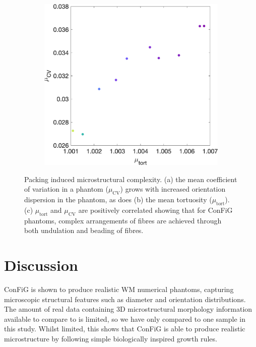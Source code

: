 \begin{figure}
\begin{subfigure}[]{0.32\textwidth}
    \caption{}
  \end{subfigure}
  ~
  \begin{subfigure}[]{0.32\textwidth}
    \includegraphics[width=\textwidth]{figures/micro/meantort_vd_meanCV}
    \caption{}
  \end{subfigure}
  \caption[Packing induced microstructural complexity]{Packing induced microstructural complexity. (a) the mean coefficient of variation in a phantom ($\mu_{\mathrm{CV}}$) grows with increased orientation dispersion in the phantom, as does (b) the mean tortuosity ($\mu_{\mathrm{tort}}$). (c) $\mu_{\mathrm{tort}}$ and $\mu_{\mathrm{CV}}$ are positively correlated showing that for \ac{ConFiG} phantoms, complex arrangements of fibres are achieved through both undulation and beading of fibres. }
  \label{fig:micro_packing_induced_complexity}
\end{figure}




\section{Discussion}
\label{sec:micro_discussion}

\ac{ConFiG} is shown to produce realistic WM numerical phantoms, capturing microscopic structural features such as diameter and orientation distributions. The amount of real data containing 3D microstructural morphology information available to compare to is limited, so we have only compared to one sample in this study. Whilst limited, this shows that \ac{ConFiG} is able to produce realistic microstructure by following simple biologically inspired growth rules.

